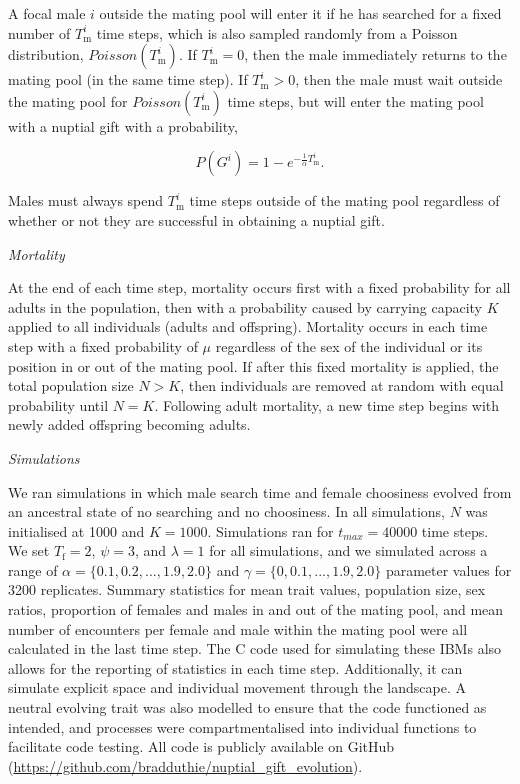 \documentclass[
]{article}
\begin{document}
A focal male \(i\) outside the mating pool will enter it if he has
searched for a fixed number of \(T^{i}_{\mathrm{m}}\) time steps, which
is also sampled randomly from a Poisson distribution,
\(Poisson(T^{i}_{\mathrm{m}})\). If \(T^{i}_{\mathrm{m}} = 0\), then the
male immediately returns to the mating pool (in the same time step). If
\(T^{i}_{\mathrm{m}} > 0\), then the male must wait outside the mating
pool for \(Poisson(T^{i}_{\mathrm{m}})\) time steps, but will enter the
mating pool with a nuptial gift with a probability,

\[P(G^{i}) = 1 - e^{-\frac{1}{\alpha}T^{i}_{\mathrm{m}}}.\]

Males must always spend \(T^{i}_{\mathrm{m}}\) time steps outside of the
mating pool regardless of whether or not they are successful in
obtaining a nuptial gift.

\emph{Mortality}

At the end of each time step, mortality occurs first with a fixed
probability for all adults in the population, then with a probability
caused by carrying capacity \(K\) applied to all individuals (adults and
offspring). Mortality occurs in each time step with a fixed probability
of \(\mu\) regardless of the sex of the individual or its position in or
out of the mating pool. If after this fixed mortality is applied, the
total population size \(N > K\), then individuals are removed at random
with equal probability until \(N = K\). Following adult mortality, a new
time step begins with newly added offspring becoming adults.

\emph{Simulations}

We ran simulations in which male search time and female choosiness
evolved from an ancestral state of no searching and no choosiness. In
all simulations, \(N\) was initialised at 1000 and \(K = 1000\).
Simulations ran for \(t_{max} = 40000\) time steps. We set
\(T_{\mathrm{f}} = 2\), \(\psi = 3\), and \(\lambda = 1\) for all
simulations, and we simulated across a range of
\(\alpha = \{0.1, 0.2, ..., 1.9, 2.0\}\) and
\(\gamma = \{0, 0.1, ..., 1.9, 2.0\}\) parameter values for 3200
replicates. Summary statistics for mean trait values, population size,
sex ratios, proportion of females and males in and out of the mating
pool, and mean number of encounters per female and male within the
mating pool were all calculated in the last time step. The C code used
for simulating these IBMs also allows for the reporting of statistics in
each time step. Additionally, it can simulate explicit space and
individual movement through the landscape. A neutral evolving trait was
also modelled to ensure that the code functioned as intended, and
processes were compartmentalised into individual functions to facilitate
code testing. All code is publicly available on GitHub
(\url{https://github.com/bradduthie/nuptial_gift_evolution}).
\end{document}
